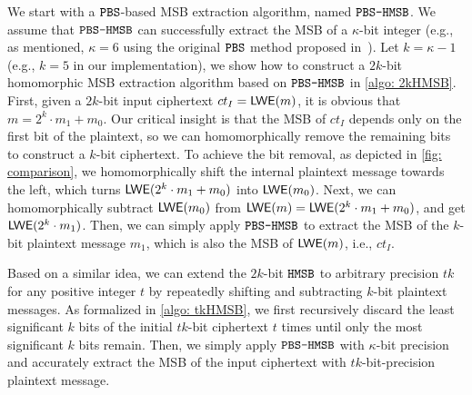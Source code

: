 We start with a $\texttt{PBS}$-based MSB extraction algorithm, named $\texttt{PBS-HMSB}$. 
We assume that $\texttt{PBS-HMSB}$ can successfully extract the MSB of a $\kappa$-bit integer 
(e.g., as mentioned, $\kappa=6$ using the original $\texttt{PBS}$ method
proposed in~\cite{DBLP:conf/asiacrypt/tfhepbs}).
Let $k=\kappa-1$ (e.g., $k=5$ in our implementation), 
we show how to construct a $2k$-bit homomorphic
MSB extraction algorithm based on $\texttt{PBS-HMSB}$ in \cref{algo: 2kHMSB}.
First, given a $2k$-bit input ciphertext 
$ct_{I} = {\mathsf{LWE}}(m)$, it is obvious that $m=2^{k}\cdot m_1 + m_0$. 
Our critical insight is that the MSB
of $ct_{I}$ depends only on the first bit 
of the plaintext, so we can homomorphically remove
the remaining bits to construct a $k$-bit ciphertext.
To achieve the bit removal, as depicted in \cref{fig: comparison},
we homomorphically shift the internal
plaintext message towards the left, which turns ${\mathsf{LWE}}(2^k \cdot m_1+m_0)$ 
into ${\mathsf{LWE}}(m_0)$. Next, we can homomorphically
subtract ${\mathsf{LWE}}(m_0)$ from ${\mathsf{LWE}}(m)={\mathsf{LWE}}(2^k\cdot m_1+m_0)$, and get ${\mathsf{LWE}}(2^k\cdot m_1)$.
Then, we can simply apply $\texttt{PBS-HMSB}$ to extract the MSB of the $k$-bit plaintext message 
$m_1$, which is also the MSB of ${\mathsf{LWE}}(m)$, i.e., $ct_{I}$.

Based on a similar idea, we can extend the $2k$-bit
$\texttt{HMSB}$ to arbitrary precision $tk$ for any positive integer $t$ by repeatedly 
shifting and subtracting $k$-bit plaintext messages. As formalized in \cref{algo: tkHMSB},
we first recursively discard the least significant $k$ bits of the initial $tk$-bit ciphertext
$t$ times until only the most significant $k$ bits remain. Then, we simply apply 
$\texttt{PBS-HMSB}$ with $\kappa$-bit precision and accurately extract the MSB of the input
ciphertext with $tk$-bit-precision plaintext message.

